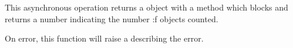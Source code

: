 This asynchronous operation returns a  object with a
 method which blocks and returns a number indicating the number
:f objects counted.

On error, this function will raise a  describing
the error.

